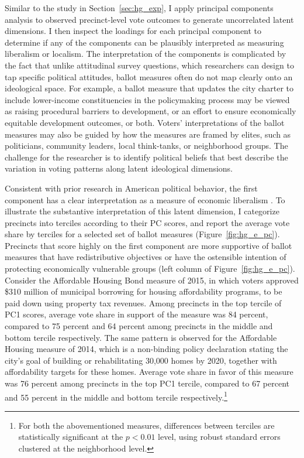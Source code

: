 \documentclass[article,12pt]{memoir}
\begin{document}
Similar to the study in Section~\ref{sec:hg_exp}, I apply principal components analysis to observed precinct-level vote outcomes to generate uncorrelated latent dimensions. I then inspect the loadings for each principal component to determine if any of the components can be plausibly interpreted as measuring liberalism or localism.  The interpretation of the components is complicated by the fact that unlike attitudinal survey questions, which researchers can design to tap specific political attitudes, ballot measures often do not map clearly onto an ideological space. For example, a ballot measure that updates the city charter to include lower-income constituencies in the policymaking process may be viewed as raising procedural barriers to development, or an effort to ensure economically equitable development outcomes, or both. Voters' interpretations of the ballot measures may also be guided by how the measures are framed by elites, such as politicians, community leaders, local think-tanks, or neighborhood groups.  The challenge for the researcher is to identify political beliefs that best describe the variation in voting patterns along latent ideological dimensions.

Consistent with prior research in American political behavior, the first component has a clear interpretation as a measure of economic liberalism \citep[e.g.][]{ansolabehere_candidate_2001,treier_nature_2009,tausanovitch_measuring_2013}.  To illustrate the substantive interpretation of this latent dimension, I categorize precincts into terciles according to their PC scores, and report the average vote share by terciles for a selected set of ballot measures (Figure~\ref{fig:hg_e_pc}). Precincts that score highly on the first component are more supportive of ballot measures that have redistributive objectives or have the ostensible intention of protecting economically vulnerable groups (left column of Figure~\ref{fig:hg_e_pc}).  Consider the Affordable Housing Bond measure of 2015, in which voters approved \$310 million of municipal borrowing for housing affordability programs, to be paid down using property tax revenues. Among precincts in the top tercile of PC1 scores, average vote share in support of the measure was 84 percent, compared to 75 percent and 64 percent among precincts in the middle and bottom tercile respectively. The same pattern is observed for the Affordable Housing measure of 2014, which is a non-binding policy declaration stating the city's goal of building or rehabilitating 30,000 homes by 2020, together with affordability targets for these homes. Average vote share in favor of this measure was 76 percent among precincts in the top PC1 tercile, compared to 67 percent and 55 percent in the middle and bottom tercile respectively.\footnote{For both the abovementioned measures, differences between terciles are statistically significant at the $p < 0.01$ level, using robust standard errors clustered at the neighborhood level.}
\end{document}
